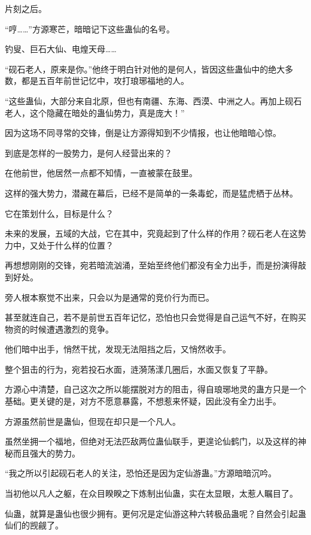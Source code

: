 
\begin{this_body}



片刻之后。

“哼……”方源寒芒，暗暗记下这些蛊仙的名号。

钓叟、巨石大仙、电煌天母……

“砚石老人，原来是你。”他终于明白针对他的是何人，皆因这些蛊仙中的绝大多数，都是五百年前世记忆中，攻打琅琊福地的人。

“这些蛊仙，大部分来自北原，但也有南疆、东海、西漠、中洲之人。再加上砚石老人，这个隐藏在暗处的蛊仙势力，真是庞大！”

因为这场不同寻常的交锋，倒是让方源得知到不少情报，也让他暗暗心惊。

到底是怎样的一股势力，是何人经营出来的？

在他前世，他居然一点都不知情，一直被蒙在鼓里。

这样的强大势力，潜藏在幕后，已经不是简单的一条毒蛇，而是猛虎栖于丛林。

它在策划什么，目标是什么？

未来的发展，五域的大战，它在其中，究竟起到了什么样的作用？砚石老人在这势力中，又处于什么样的位置？

再想想刚刚的交锋，宛若暗流汹涌，至始至终他们都没有全力出手，而是扮演得敲到好处。

旁人根本察觉不出来，只会以为是通常的竞价行为而已。

甚至就连自己，若不是前世五百年记忆，恐怕也只会觉得是自己运气不好，在购买物资的时候遭遇激烈的竞争。

他们暗中出手，悄然干扰，发现无法阻挡之后，又悄然收手。

整个狙击的行为，宛若投石水面，涟漪荡漾几圈后，水面又恢复了平静。

方源心中清楚，自己这次之所以能摆脱对方的阻击，得自琅琊地灵的蛊方只是一个基础。更关键的是，对方不愿意暴露，不想惹来怀疑，因此没有全力出手。

方源虽然前世是蛊仙，但现在却只是一个凡人。

虽然坐拥一个福地，但绝对无法匹敌两位蛊仙联手，更遑论仙鹤门，以及这样的神秘而且强大的势力。

“我之所以引起砚石老人的关注，恐怕还是因为定仙游蛊。”方源暗暗沉吟。

当初他以凡人之躯，在众目睽睽之下炼制出仙蛊，实在太显眼，太惹人瞩目了。

仙蛊，就算是蛊仙也很少拥有。更何况是定仙游这种六转极品蛊呢？自然会引起蛊仙们的觊觎了。


\end{this_body}
